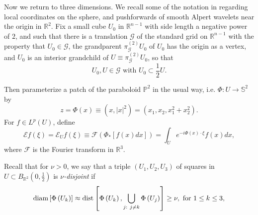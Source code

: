 \documentclass{amsart}%
\theoremstyle{plain}
\numberwithin{equation}{section}
\begin{document}
Now we return to three dimensions. We recall some of the notation in
\cite[Subsection 1.4]{Saw7} regarding local coordinates on the sphere, and
pushforwards of smooth Alpert wavelets near the origin in $\mathbb{R}^{2}$.
Fix a small cube $U_{0}$ in $\mathbb{R}^{n-1}$ with side length a negative
power of $2$, and such that there is a translation $\mathcal{G}$ of the
standard grid on $\mathbb{R}^{n-1}$ with the property that $U_{0}%
\in\mathcal{G}$, the grandparent $\pi_{\mathcal{G}}^{\left(  2\right)  }U_{0}$
of $U_{0}$ has the origin as a vertex, and $U_{0}$ is an interior grandchild
of $U\equiv\pi_{\mathcal{G}}^{\left(  2\right)  }U_{0}$, so that%
\begin{equation}
U_{0},U\in\mathcal{G}\text{ with }U_{0}\subset\frac{1}{2}U\text{.}%
\label{support}%
\end{equation}


Then parameterize a patch of the paraboloid $\mathbb{P}^{2}$ in the usual way,
i.e. $\Phi:U\rightarrow\mathbb{S}^{2}$ by
\[
z=\Phi\left(  x\right)  \equiv\left(  x,\left\vert x\right\vert ^{2}\right)
=\left(  x_{1},x_{2},x_{1}^{2}+x_{2}^{2}\right)  .
\]
For $f\in L^{p}\left(  U\right)  $, define
\[
\mathcal{E}f\left(  \xi\right)  =\mathcal{E}_{U}f\left(  \xi\right)
\equiv\mathcal{F}\left(  \Phi_{\ast}\left[  f\left(  x\right)  dx\right]
\right)  =\int_{U}e^{-i\Phi\left(  x\right)  \cdot\xi}f\left(  x\right)  dx,
\]
where $\mathcal{F}$ is the Fourier transform in $\mathbb{R}^{3}$.

Recall that for $\nu>0$, we say that a triple $\left(  U_{1},U_{2}%
,U_{3}\right)  $ of squares in $U\subset B_{\mathbb{R}^{2}}\left(  0,\frac
{1}{2}\right)  $ is $\nu$\emph{-disjoint} if
\[
\mathop{\rm diam}\left[  \Phi\left(  U_{k}\right)  \right]  \approx
\mathop{\rm dist}\left[  \Phi\left(  U_{k}\right)  ,\bigcup_{j:\ j\neq k}%
\Phi\left(  U_{j}\right)  \right]  \geq\nu,\text{ for }1\leq k\leq3,
\]
\end{document}
